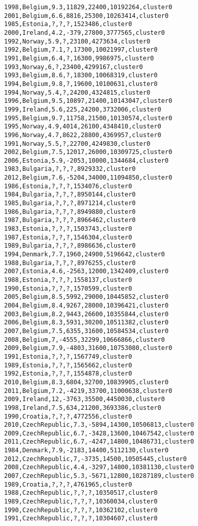 \begin{lstlisting}[basicstyle=\footnotesize\ttfamily,numbers=none]
1998,Belgium,9.3,11829,22400,10192264,cluster0
2001,Belgium,6.6,8816,25300,10263414,cluster0
1985,Estonia,?,?,?,1523486,cluster0
2000,Ireland,4.2,-379,27800,3777565,cluster0
1992,Norway,5.9,?,23100,4273634,cluster0
1992,Belgium,7.1,?,17300,10021997,cluster0
1991,Belgium,6.4,?,16300,9986975,cluster0
1993,Norway,6,?,23400,4299167,cluster0
1993,Belgium,8.6,?,18300,10068319,cluster0
1994,Belgium,9.8,?,19600,10100631,cluster0
1994,Norway,5.4,?,24200,4324815,cluster0
1996,Belgium,9.5,10897,21400,10143047,cluster0
1999,Ireland,5.6,225,24200,3732006,cluster0
1995,Belgium,9.7,11758,21500,10130574,cluster0
1995,Norway,4.9,4014,26100,4348410,cluster0
1996,Norway,4.7,8622,28800,4369957,cluster0
1991,Norway,5.5,?,22700,4249830,cluster0
2002,Belgium,7.5,12017,26000,10309725,cluster0
2006,Estonia,5.9,-2053,10000,1344684,cluster0
1983,Bulgaria,?,?,?,8929332,cluster0
2012,Belgium,7.6,-5204,34000,11094850,cluster0
1986,Estonia,?,?,?,1534076,cluster0
1984,Bulgaria,?,?,?,8950144,cluster0
1985,Bulgaria,?,?,?,8971214,cluster0
1986,Bulgaria,?,?,?,8949880,cluster0
1987,Bulgaria,?,?,?,8966462,cluster0
1983,Estonia,?,?,?,1503743,cluster0
1987,Estonia,?,?,?,1546304,cluster0
1989,Bulgaria,?,?,?,8986636,cluster0
1994,Denmark,7.7,1960,24900,5196642,cluster0
1988,Bulgaria,?,?,?,8976255,cluster0
2007,Estonia,4.6,-2563,12000,1342409,cluster0
1988,Estonia,?,?,?,1558137,cluster0
1990,Estonia,?,?,?,1570599,cluster0
2005,Belgium,8.5,5992,29000,10445852,cluster0
2004,Belgium,8.4,9267,28000,10396421,cluster0
2003,Belgium,8.2,9443,26600,10355844,cluster0
2006,Belgium,8.3,5931,30200,10511382,cluster0
2007,Belgium,7.5,6355,31600,10584534,cluster0
2008,Belgium,7,-4555,32299,10666866,cluster0
2009,Belgium,7.9,-4803,31600,10753080,cluster0
1991,Estonia,?,?,?,1567749,cluster0
1989,Estonia,?,?,?,1565662,cluster0
1992,Estonia,?,?,?,1554878,cluster0
2010,Belgium,8.3,6804,32700,10839905,cluster0
2011,Belgium,7.2,-4219,33700,11000638,cluster0
2009,Ireland,12,-3763,35500,4450030,cluster0
1998,Ireland,7.5,634,21200,3693386,cluster0
1990,Croatia,?,?,?,4772556,cluster0
2010,CzechRepublic,7.3,-5894,14300,10506813,cluster0
2009,CzechRepublic,6.7,-3428,13600,10467542,cluster0
2011,CzechRepublic,6.7,-4247,14800,10486731,cluster0
1984,Denmark,7.9,-2183,14400,5112130,cluster0
2012,CzechRepublic,7,-3735,14500,10505445,cluster0
2008,CzechRepublic,4.4,-3297,14800,10381130,cluster0
2007,CzechRepublic,5.3,-5671,12800,10287189,cluster0
1989,Croatia,?,?,?,4761965,cluster0
1988,CzechRepublic,?,?,?,10350517,cluster0
1989,CzechRepublic,?,?,?,10360034,cluster0
1990,CzechRepublic,?,?,?,10362102,cluster0
1991,CzechRepublic,?,?,?,10304607,cluster0

\end{lstlisting}
